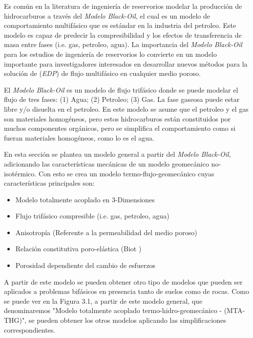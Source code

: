 Es común en la literatura de ingeniería de reservorios modelar la producción de hidrocarburos a través del \textit{Modelo Black-Oil}, el cual es un modelo de comportamiento multifásico que es estándar en la industria del petroleo. Este modelo es capaz de predecir la compresibilidad y los efectos de transferencia de masa entre fases (i.e. gas, petroleo, agua). La importancia del \textit{Modelo Black-Oil} para los estudios de ingeniería de reservorios lo convierte en un modelo importante para investigadores interesados en desarrollar nuevos métodos para la solución de (\textit{EDP}) de flujo multifásico en cualquier medio poroso\cite{Huan1986TheReservoir}.\bigskip

El \textit{Modelo Black-Oil} es un modelo de flujo trifásico donde se puede modelar el flujo de tres fases: (1) Agua; (2) Petroleo; (3) Gas. La fase gaseosa puede estar libre y/o disuelta en el petroleo. En este modelo se asume que el petroleo y el gas son materiales homogéneos, pero estos hidrocarburos están constituidos por muchos componentes orgánicos, pero se simplifica el comportamiento como si fueran materiales homogéneos, como lo es el agua.\bigskip

En esta sección se plantea un modelo general a partir del \textit{Modelo Black-Oil}, adicionando las características mecánicas de un modelo geomecánico no-isotérmico. Con esto se crea un modelo termo-flujo-geomecánico cuyas características principales son:

\begin{itemize}
    \item Modelo totalmente acoplado en 3-Dimensiones
    \item Flujo trifásico compresible (i.e. gas, petroleo, agua)
    \item Anisotropía (Referente a la permeabilidad del medio poroso)
    \item Relación constitutiva poro-elástica (Biot \cite{Biot1941GeneralConsolidation})
    \item Porosidad dependiente del cambio de esfuerzos
\end{itemize}

A partir de este modelo se pueden obtener otro tipo de modelos que pueden ser aplicados a problemas bifásicos en presencia tanto de suelos como de rocas. Como se puede ver en la Figura 3.1, a partir de este modelo general, que denominaremos "Modelo totalmente acoplado termo-hidro-geomecánico - (MTA-THG)", se pueden obtener los otros modelos aplicando las simplificaciones correspondientes.\bigskip

